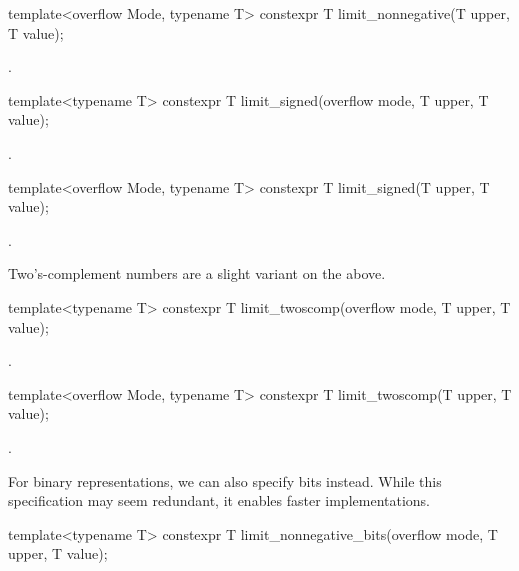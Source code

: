 \begin{addedblock}
\begin{itemdecl}
template<overflow Mode, typename T>
constexpr T limit_nonnegative(T upper, T value);
\end{itemdecl}

\begin{itemdescr}
\returns {}.
\end{itemdescr}

\begin{itemdecl}
template<typename T>
constexpr T limit_signed(overflow mode, T upper, T value);
\end{itemdecl}

\begin{itemdescr}
\returns {}.
\end{itemdescr}

\begin{itemdecl}
template<overflow Mode, typename T>
constexpr T limit_signed(T upper, T value);
\end{itemdecl}

\begin{itemdescr}
\returns {}.
\end{itemdescr}

Two's-complement numbers are a slight variant on the above.

\begin{itemdecl}
template<typename T>
constexpr T limit_twoscomp(overflow mode, T upper, T value);
\end{itemdecl}

\begin{itemdescr}
\returns {}.
\end{itemdescr}

\begin{itemdecl}
template<overflow Mode, typename T>
constexpr T limit_twoscomp(T upper, T value);
\end{itemdecl}

\begin{itemdescr}
\returns {}.
\end{itemdescr}

For binary representations, we can also specify bits instead. While this specification may seem redundant, it enables faster implementations.

\begin{itemdecl}
template<typename T>
constexpr T limit_nonnegative_bits(overflow mode, T upper, T value);
\end{itemdecl}


\end{addedblock}
